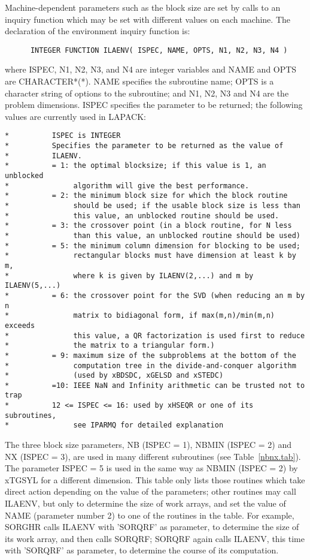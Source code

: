 Machine-dependent
parameters such as the block size are set
by calls to an inquiry function which may be set with different
values on each machine.
The declaration of the environment inquiry function is:
\begin{verbatim}
      INTEGER FUNCTION ILAENV( ISPEC, NAME, OPTS, N1, N2, N3, N4 )
\end{verbatim}
where ISPEC, N1, N2, N3, and N4 are integer variables and
NAME and OPTS are CHARACTER*(*).  NAME specifies the subroutine name;
OPTS is a character string of options to the subroutine; and N1, N2, N3 and N4 are
the problem dimensions.
ISPEC specifies the parameter to be returned; the following values are
currently used in LAPACK:

\begin{verbatim}
*          ISPEC is INTEGER
*          Specifies the parameter to be returned as the value of
*          ILAENV.
*          = 1: the optimal blocksize; if this value is 1, an unblocked
*               algorithm will give the best performance.
*          = 2: the minimum block size for which the block routine
*               should be used; if the usable block size is less than
*               this value, an unblocked routine should be used.
*          = 3: the crossover point (in a block routine, for N less
*               than this value, an unblocked routine should be used)
*          = 5: the minimum column dimension for blocking to be used;
*               rectangular blocks must have dimension at least k by m,
*               where k is given by ILAENV(2,...) and m by ILAENV(5,...)
*          = 6: the crossover point for the SVD (when reducing an m by n
*               matrix to bidiagonal form, if max(m,n)/min(m,n) exceeds
*               this value, a QR factorization is used first to reduce
*               the matrix to a triangular form.)
*          = 9: maximum size of the subproblems at the bottom of the
*               computation tree in the divide-and-conquer algorithm
*               (used by xBDSDC, xGELSD and xSTEDC)
*          =10: IEEE NaN and Infinity arithmetic can be trusted not to trap
*          12 <= ISPEC <= 16: used by xHSEQR or one of its subroutines,
*               see IPARMQ for detailed explanation
\end{verbatim}

The three block size parameters, NB (ISPEC = 1), NBMIN (ISPEC = 2) and NX (ISPEC = 3), 
are used in many different
subroutines (see Table~\ref{nbnx.tab}).
The parameter ISPEC = 5 is used in the same way as NBMIN (ISPEC = 2) by xTGSYL for a
different dimension.
This table only lists those routines which take direct action depending on the value of the
parameters; other routines may call ILAENV, but only to determine the size of work arrays,
and set the value of NAME (parameter number 2) to one of the routines in the table.
For example, SORGHR calls ILAENV with 'SORQRF' as parameter,
to determine the size of its work array,
and then calls SORQRF; SORQRF again calls ILAENV, this time with 'SORQRF' as parameter,
to determine the course of its computation.

